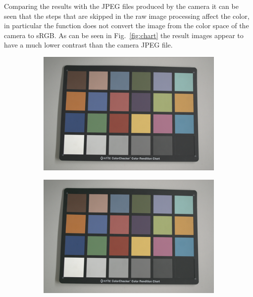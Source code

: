 \documentclass[a4paper,oneside]{article}
\begin{document}
Comparing the results with the JPEG files produced by the camera it
can be seen that the steps that are skipped in the raw image processing
affect the color, in particular the  function
does not convert the image from the color space of the camera to
sRGB. As can be seen in Fig.~\ref{fig:chart} the result images appear
to have a much lower contrast than the camera JPEG file.
\begin{figure}[htbp]
  \centering
  \begin{subfigure}{.33\textwidth}
  \centering
  \includegraphics[width=.95\linewidth]{demosaic_macbeth_color_small}
  \caption{}
\end{subfigure}%
\begin{subfigure}{.33\textwidth}
  \centering
  \includegraphics[width=.95\linewidth]{matlab_demosaic_macbeth_color_small}
  \caption{}
\end{subfigure}%
  \begin{subfigure}{.33\textwidth}

\end{subfigure}
\end{figure}
\end{document}
